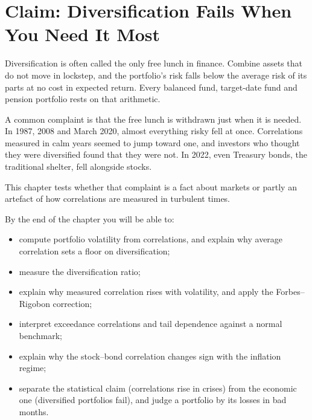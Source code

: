 \makeatletter
{}
\makeatother

\chapter{Claim: Diversification Fails When You Need It Most}
\label{ch:20}

Diversification is often called the only free lunch in finance. Combine assets that do not move in lockstep, and the portfolio's risk falls below the average risk of its parts at no cost in expected return. Every balanced fund, target-date fund and pension portfolio rests on that arithmetic.

A common complaint is that the free lunch is withdrawn just when it is needed. In 1987, 2008 and March 2020, almost everything risky fell at once. Correlations measured in calm years seemed to jump toward one, and investors who thought they were diversified found that they were not. In 2022, even Treasury bonds, the traditional shelter, fell alongside stocks.

This chapter tests whether that complaint is a fact about markets or partly an artefact of how correlations are measured in turbulent times.

By the end of the chapter you will be able to:

\begin{itemize}
  \item compute portfolio volatility from correlations, and explain why average correlation sets a floor on diversification;
  \item measure the diversification ratio;
  \item explain why measured correlation rises with volatility, and apply the Forbes--Rigobon correction;
  \item interpret exceedance correlations and tail dependence against a normal benchmark;
  \item explain why the stock--bond correlation changes sign with the inflation regime;
  \item separate the statistical claim (correlations rise in crises) from the economic one (diversified portfolios fail), and judge a portfolio by its losses in bad months.
\end{itemize}

